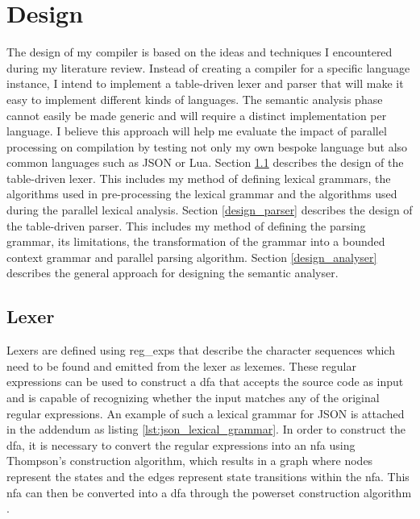 \chapter{Design} \label{design}

The design of my compiler is based on the ideas and techniques I encountered
during my literature review. Instead of creating a compiler for a specific
language instance, I intend to implement a table-driven lexer and parser that
will make it easy to implement different kinds of languages. The semantic
analysis phase cannot easily be made generic and will require a distinct
implementation per language. I believe this approach will help me evaluate the
impact of parallel processing on compilation by testing not only my own bespoke
language but also common languages such as JSON or Lua.
\newline\newline
Section \ref{design_lexer} describes the design of the table-driven lexer.
This includes my method of defining lexical grammars, the algorithms used in
pre-processing the lexical grammar and the algorithms used during the parallel
lexical analysis.
\newline\newline
Section \ref{design_parser} describes the design of the table-driven parser.
This includes my method of defining the parsing grammar, its limitations,
the transformation of the grammar into a bounded context grammar and parallel
parsing algorithm.
\newline\newline
Section \ref{design_analyser} describes the general approach for designing the
semantic analyser.

\section{Lexer} \label{design_lexer}

Lexers are defined using \glspl{reg_exp} that describe the character sequences which need to be
found and emitted from the lexer as lexemes. These regular expressions can be used to construct
a \gls{dfa} that accepts the source code as input and is capable of recognizing whether the
input matches any of the original regular expressions. An example of such a lexical grammar
for JSON is attached in the addendum as listing \ref{lst:json_lexical_grammar}. In order to
construct the \gls{dfa}, it is necessary to convert the regular expressions into an \gls{nfa}
using Thompson's construction algorithm\citep{aho_compilers_2006}, which results in a graph where
nodes represent the states and the edges represent state transitions within the \gls{nfa}. This
\gls{nfa} can then be converted into a \gls{dfa} through the powerset construction algorithm
\citep{noauthor_powerset_2023}.

